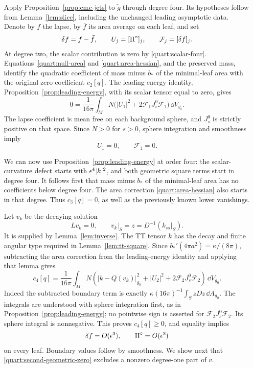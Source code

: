 Apply Proposition~\ref{prop:cmc-jets} to \(\widetilde g\) through
degree four.  Its hypotheses follow from
Lemma~\ref{lem:slice}, including the unchanged leading asymptotic
data.  Denote by \(f\) the lapse, by \(\bar f\) its area average on
each leaf, and set
\[
 \delta f=f-\bar f,\qquad
 U_j=[\mathrm{II}^{\circ}]_j,\qquad \mathcal F_j=[\delta f]_j.
\]
At degree two, the scalar contribution is zero by
\eqref{quart:scalar-four}.  Equations~\eqref{quart:null-area} and
\eqref{quart:area-hessian}, and the preserved mass, identify the
quadratic coefficient of mass minus \(b_*\) of the minimal-leaf area
with the original zero coefficient \(c_2[q]\).  The leading-energy
identity, Proposition~\ref{prop:leading-energy}, with its scalar
tensor equal to zero, gives
\[
 0=\frac1{16\pi}\int_M N
       \bigl(|U_1|^2+2\mathcal F_1J_s^0\mathcal F_1\bigr)\,\dd V_{g_0}.
\]
The lapse coefficient is mean free on each background sphere, and
\(J_s^0\) is strictly positive on that space.  Since \(N>0\) for
\(s>0\), sphere integration and smoothness imply
\begin{equation}
 U_1=0,\qquad \mathcal F_1=0.
 \label{quart:first-geometric-zero}
\end{equation}

We can now use Proposition~\ref{prop:leading-energy} at order four:
the scalar-curvature defect starts with
\(\epsilon^4|k|^2\), and both geometric square terms start in degree
four.  It follows first that mass minus \(b_*\) of the minimal-leaf
area has no coefficients below degree four.  The area correction
\eqref{quart:area-hessian} also starts in that degree.  Thus
\(c_3[q]=0\), as well as the previously known lower vanishings.

Let \(v_k\) be the decaying solution
\begin{equation}
 Lv_k=0,\qquad v_k|_S=z=D^{-1}(k_{ss}|_S).
 \label{quart:vk}
\end{equation}
It is supplied by Lemma~\ref{lem:inverse}.  The TT tensor \(k\) has
the decay and finite angular type required in
Lemma~\ref{lem:tt-square}.  Since
\(b_*'(4\pi a^2)=\kappa/(8\pi)\), subtracting the area correction
from the leading-energy identity and applying that lemma gives
\begin{equation}
 c_4[q]=\frac1{16\pi}\int_M N
   \left(
      |k-Q(v_k)|_{g_0}^2+|U_2|^2+2\mathcal F_2J_s^0\mathcal F_2
   \right)\,\dd V_{g_0}.
 \label{quart:square}
\end{equation}
Indeed the subtracted boundary term is exactly
\(\kappa(16\pi)^{-1}\int_S zDz\,\dd A_{g_0}\).
The integrals are understood with sphere integration first, as in
Proposition~\ref{prop:leading-energy}; no pointwise sign is asserted
for \(\mathcal F_2J_s^0\mathcal F_2\).  Its sphere integral is nonnegative.  This proves
\(c_4[q]\geq0\), and equality implies
\begin{equation}
 \delta f=O(\epsilon^3),\qquad
 \mathrm{II}^{\circ}=O(\epsilon^3)
 \label{quart:second-geometric-zero}
\end{equation}
on every leaf.  Boundary values follow by smoothness.  We show next
that \eqref{quart:second-geometric-zero} excludes a nonzero degree-one
part of \(v\).

